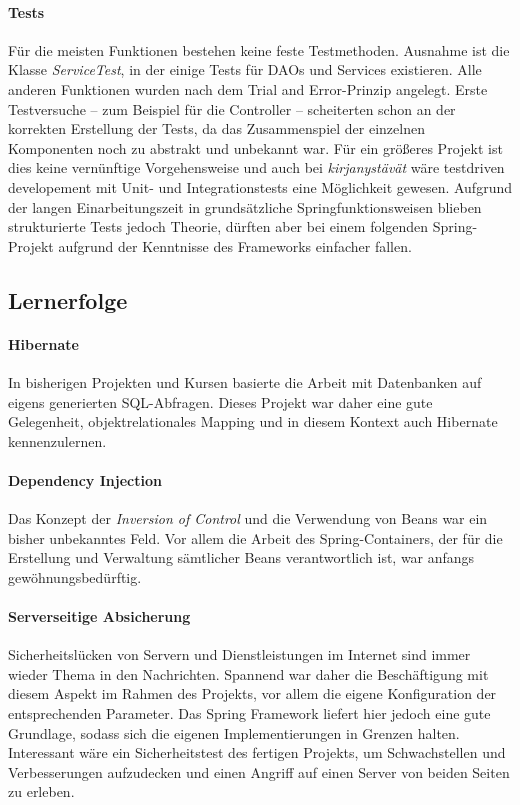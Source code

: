 		\paragraph{Tests} Für die meisten Funktionen bestehen keine feste Testmethoden. Ausnahme ist die Klasse \textit{ServiceTest}, in der einige Tests für DAOs und Services existieren. Alle anderen Funktionen wurden nach dem Trial and Error-Prinzip angelegt. Erste Testversuche -- zum Beispiel für die Controller -- scheiterten schon an der korrekten Erstellung der Tests, da das Zusammenspiel der einzelnen Komponenten noch zu abstrakt und unbekannt war. Für ein größeres Projekt ist dies keine vernünftige Vorgehensweise und auch bei \textit{kirjanystävät} wäre testdriven developement mit Unit- und Integrationstests eine Möglichkeit gewesen. Aufgrund der langen Einarbeitungszeit in grundsätzliche Springfunktionsweisen blieben strukturierte Tests jedoch Theorie, dürften aber bei einem folgenden Spring-Projekt aufgrund der Kenntnisse des Frameworks einfacher fallen.

	\subsection{Lernerfolge}
		\paragraph{Hibernate} In bisherigen Projekten und Kursen basierte die Arbeit mit Datenbanken auf eigens generierten SQL-Abfragen. Dieses Projekt war daher eine gute Gelegenheit, objekt\-relationales Mapping und in diesem Kontext auch Hibernate kennenzulernen.
		
		\paragraph{Dependency Injection} Das Konzept der \textit{Inversion of Control} und die Verwendung von Beans war ein bisher unbekanntes Feld. Vor allem die Arbeit des Spring-Containers, der für die Erstellung und Verwaltung sämtlicher Beans verantwortlich ist, war anfangs ge\-wöhnungs\-be\-dürftig.
		
		\paragraph{Serverseitige Absicherung}
		Sicherheitslücken von Servern und Dienstleistungen im Internet sind immer wieder Thema in den Nachrichten. Spannend war daher die Be\-schäf\-ti\-gung mit diesem Aspekt im Rahmen des Projekts, vor allem die eigene Konfiguration der entsprechenden Parameter. Das Spring Framework liefert hier jedoch eine gute Grundlage, sodass sich die eigenen Implementierungen in Grenzen halten. Interessant wäre ein Sicherheitstest des fertigen Projekts, um Schwachstellen und Verbesserungen aufzudecken und einen Angriff auf einen Server von beiden Seiten zu erleben.
		
